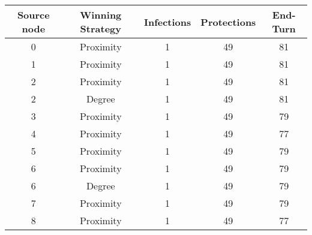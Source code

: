 \documentclass[results.tex]{subfiles}
\begin{document}
    \begin{center}
        \begin{tabular}{| c || c | c | c | c |}
            \hline
            {\bfseries Source node} & {\bfseries Winning Strategy} & {\bfseries Infections} & {\bfseries Protections}
            & {\bfseries End-Turn}
            \\  %
            \hline\hline
            0                       & Proximity                    & 1                      & 49                      & 81                   \\
            \hline
            1                       & Proximity                    & 1                      & 49                      & 81                   \\
            \hline
            2                       & Proximity                    & 1                      & 49                      & 81                   \\
            \hline
            2                       & Degree                       & 1                      & 49                      & 81                   \\
            \hline
            3                       & Proximity                    & 1                      & 49                      & 79                   \\
            \hline
            4                       & Proximity                    & 1                      & 49                      & 77                   \\
            \hline
            5                       & Proximity                    & 1                      & 49                      & 79                   \\
            \hline
            6                       & Proximity                    & 1                      & 49                      & 79                   \\
            \hline
            6                       & Degree                       & 1                      & 49                      & 79                   \\
            \hline
            7                       & Proximity                    & 1                      & 49                      & 79                   \\
            \hline
            8                       & Proximity                    & 1                      & 49                      & 77                   \\

\end{tabular}
\end{center}
\end{document}
